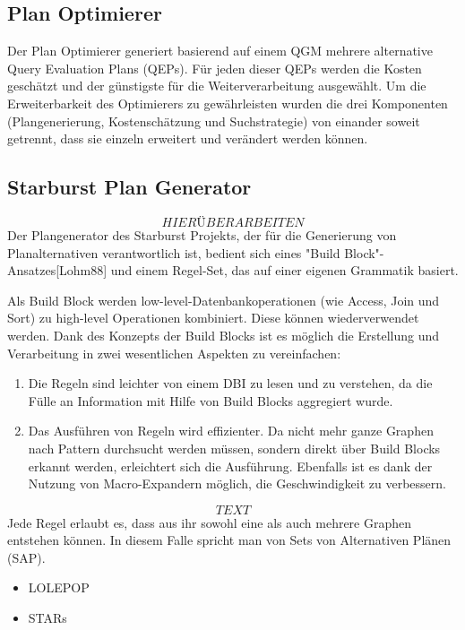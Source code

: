 \subsection{Plan Optimierer}

Der Plan Optimierer generiert basierend auf einem QGM mehrere alternative Query Evaluation Plans (QEPs). Für jeden dieser QEPs werden die Kosten geschätzt und der günstigste für die Weiterverarbeitung ausgewählt. Um die Erweiterbarkeit des Optimierers zu gewährleisten wurden die drei Komponenten (Plangenerierung, Kostenschätzung und Suchstrategie) von einander soweit getrennt, dass sie einzeln erweitert und verändert werden können. 

\subsection{Starburst Plan Generator}
$$HIER ÜBERARBEITEN$$
Der Plangenerator des Starburst Projekts, der für die Generierung von Planalternativen verantwortlich ist, bedient sich eines "Build Block"-Ansatzes[Lohm88] und einem Regel-Set, das auf einer eigenen Grammatik basiert.  

Als Build Block werden low-level-Datenbankoperationen (wie Access, Join und Sort) zu high-level Operationen kombiniert. Diese können wiederverwendet werden. Dank des Konzepts der Build Blocks ist es möglich die Erstellung und Verarbeitung in zwei wesentlichen Aspekten zu vereinfachen:


\begin{enumerate}


\item Die Regeln sind leichter von einem DBI zu lesen und zu verstehen, da die Fülle an Information mit Hilfe von Build Blocks aggregiert wurde.

\item Das Ausführen von Regeln wird effizienter. Da nicht mehr ganze Graphen nach Pattern durchsucht werden müssen, sondern direkt über Build Blocks erkannt werden, erleichtert sich die Ausführung. Ebenfalls ist es dank der Nutzung von Macro-Expandern möglich, die Geschwindigkeit zu verbessern.


\end{enumerate}


$$TEXT$$
Jede Regel erlaubt es, dass aus ihr sowohl eine als auch mehrere Graphen entstehen können. In diesem Falle spricht man von Sets von Alternativen Plänen (SAP). 


\begin{itemize}
\item LOLEPOP
\item STARs
\end{itemize}

 